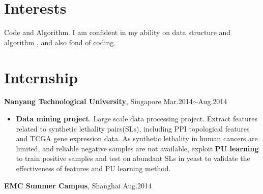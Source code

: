 \documentclass[margin]{res}
\begin{document}
\begin{resume}
\section{Interests}
Code and Algorithm. I am confident in my ability on data structure and algorithm , and also fond of coding.
\section{Internship}
\textbf{Nanyang Technological University}, Singapore \hfill Mar.2014$\sim$Aug.2014
\begin{itemize}
\item \textbf{Data mining project}. Large scale data processing project. Extract features related to synthetic lethality pairs(SLs), including PPI topological features and TCGA gene expression data. As synthetic lethality in human cancers are limited, and reliable negative samples are not available, exploit \textbf{PU learning} to train positive samples and test on abundant SLs in yeast to validate the effectiveness of features and PU learning method.
\end{itemize}
\begin{spacing}{1.5}
\end{spacing}
\textbf{EMC Summer Campus}, Shanghai \hfill Aug.2014

\end{resume}
\end{document}
